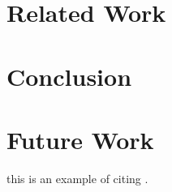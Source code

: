 \documentclass{article}
\begin{document}
\section{Related Work }

\section{Conclusion}

\section{Future Work}
\indent this is an example of citing \cite{Laboratories79make}. \\



\end{document}
